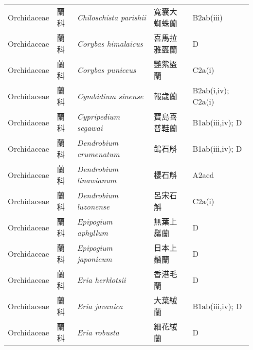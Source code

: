{\begin{longtable}{p{2.5cm}p{2.5cm}p{4.5cm}p{2.5cm}p{3cm}}
    Orchidaceae & 蘭科 & \textit{Chiloschista parishii}  & 寬囊大蜘蛛蘭 & B2ab(iii) \index{Chiloschista@\textit{Chiloschista}!parishii@\textit{parishii}}  \index{寬囊大蜘蛛蘭} \\
    Orchidaceae & 蘭科 & \textit{Corybas himalaicus}  & 喜馬拉雅盔蘭 & D \index{Corybas@\textit{Corybas}!himalaicus@\textit{himalaicus}}  \index{喜馬拉雅盔蘭} \\
    Orchidaceae & 蘭科 & \textit{Corybas puniceus}  & 艷紫盔蘭 & C2a(i) \index{Corybas@\textit{Corybas}!puniceus@\textit{puniceus}}  \index{艷紫盔蘭} \\
    Orchidaceae & 蘭科 & \textit{Cymbidium sinense}  & 報歲蘭 & B2ab(i,iv); C2a(i) \index{Cymbidium@\textit{Cymbidium}!sinense@\textit{sinense}}  \index{報歲蘭} \\
    Orchidaceae & 蘭科 & \textit{Cypripedium segawai}  & 寶島喜普鞋蘭 & B1ab(iii,iv); D \index{Cypripedium@\textit{Cypripedium}!segawai@\textit{segawai}}  \index{寶島喜普鞋蘭} \\
    Orchidaceae & 蘭科 & \textit{Dendrobium crumenatum}  & 鴿石斛 & B1ab(iii,iv); D \index{Dendrobium@\textit{Dendrobium}!crumenatum@\textit{crumenatum}}  \index{鴿石斛} \\
    Orchidaceae & 蘭科 & \textit{Dendrobium linawianum}  & 櫻石斛 & A2acd \index{Dendrobium@\textit{Dendrobium}!linawianum@\textit{linawianum}}  \index{櫻石斛} \\
    Orchidaceae & 蘭科 & \textit{Dendrobium luzonense}  & 呂宋石斛 & C2a(i) \index{Dendrobium@\textit{Dendrobium}!luzonense@\textit{luzonense}}  \index{呂宋石斛} \\
    Orchidaceae & 蘭科 & \textit{Epipogium aphyllum}  & 無葉上鬚蘭 & D \index{Epipogium@\textit{Epipogium}!aphyllum@\textit{aphyllum}}  \index{無葉上鬚蘭} \\
    Orchidaceae & 蘭科 & \textit{Epipogium japonicum}  & 日本上鬚蘭 & D \index{Epipogium@\textit{Epipogium}!japonicum@\textit{japonicum}}  \index{日本上鬚蘭} \\
    Orchidaceae & 蘭科 & \textit{Eria herklotsii}  & 香港毛蘭 & D \index{Eria@\textit{Eria}!herklotsii@\textit{herklotsii}}  \index{香港毛蘭} \\
    Orchidaceae & 蘭科 & \textit{Eria javanica}  & 大葉絨蘭 & B1ab(iii,iv); D \index{Eria@\textit{Eria}!javanica@\textit{javanica}}  \index{大葉絨蘭} \\
    Orchidaceae & 蘭科 & \textit{Eria robusta}  & 細花絨蘭 & D \index{Eria@\textit{Eria}!robusta@\textit{robusta}}  \index{細花絨蘭} \\

\end{longtable}}
